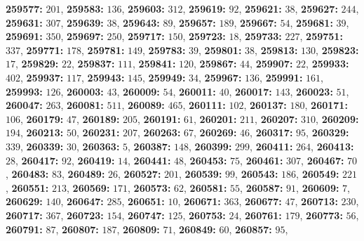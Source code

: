 \textsf{\bfseries 259577:} $201$, \textsf{\bfseries 259583:} $136$, \textsf{\bfseries 259603:} $312$, \textsf{\bfseries 259619:} $92$, \textsf{\bfseries 259621:} $38$, \textsf{\bfseries 259627:} $244$, \textsf{\bfseries 259631:} $307$, \textsf{\bfseries 259639:} $38$, \textsf{\bfseries 259643:} $89$, \textsf{\bfseries 259657:} $189$, \textsf{\bfseries 259667:} $54$, \textsf{\bfseries 259681:} $39$, \textsf{\bfseries 259691:} $350$, \textsf{\bfseries 259697:} $250$, \textsf{\bfseries 259717:} $150$, \textsf{\bfseries 259723:} $18$, \textsf{\bfseries 259733:} $227$, \textsf{\bfseries 259751:} $337$, \textsf{\bfseries 259771:} $178$, \textsf{\bfseries 259781:} $149$, \textsf{\bfseries 259783:} $39$, \textsf{\bfseries 259801:} $38$, \textsf{\bfseries 259813:} $130$, \textsf{\bfseries 259823:} $17$, \textsf{\bfseries 259829:} $22$, \textsf{\bfseries 259837:} $111$, \textsf{\bfseries 259841:} $120$, \textsf{\bfseries 259867:} $44$, \textsf{\bfseries 259907:} $22$, \textsf{\bfseries 259933:} $402$, \textsf{\bfseries 259937:} $117$, \textsf{\bfseries 259943:} $145$, \textsf{\bfseries 259949:} $34$, \textsf{\bfseries 259967:} $136$, \textsf{\bfseries 259991:} $161$, \textsf{\bfseries 259993:} $126$, \textsf{\bfseries 260003:} $43$, \textsf{\bfseries 260009:} $54$, \textsf{\bfseries 260011:} $40$, \textsf{\bfseries 260017:} $143$, \textsf{\bfseries 260023:} $51$, \textsf{\bfseries 260047:} $263$, \textsf{\bfseries 260081:} $511$, \textsf{\bfseries 260089:} $465$, \textsf{\bfseries 260111:} $102$, \textsf{\bfseries 260137:} $180$, \textsf{\bfseries 260171:} $106$, \textsf{\bfseries 260179:} $47$, \textsf{\bfseries 260189:} $205$, \textsf{\bfseries 260191:} $61$, \textsf{\bfseries 260201:} $211$, \textsf{\bfseries 260207:} $310$, \textsf{\bfseries 260209:} $194$, \textsf{\bfseries 260213:} $50$, \textsf{\bfseries 260231:} $207$, \textsf{\bfseries 260263:} $67$, \textsf{\bfseries 260269:} $46$, \textsf{\bfseries 260317:} $95$, \textsf{\bfseries 260329:} $339$, \textsf{\bfseries 260339:} $30$, \textsf{\bfseries 260363:} $5$, \textsf{\bfseries 260387:} $148$, \textsf{\bfseries 260399:} $299$, \textsf{\bfseries 260411:} $264$, \textsf{\bfseries 260413:} $28$, \textsf{\bfseries 260417:} $92$, \textsf{\bfseries 260419:} $14$, \textsf{\bfseries 260441:} $48$, \textsf{\bfseries 260453:} $75$, \textsf{\bfseries 260461:} $307$, \textsf{\bfseries 260467:} $70$, \textsf{\bfseries 260483:} $83$, \textsf{\bfseries 260489:} $26$, \textsf{\bfseries 260527:} $201$, \textsf{\bfseries 260539:} $99$, \textsf{\bfseries 260543:} $186$, \textsf{\bfseries 260549:} $221$, \textsf{\bfseries 260551:} $213$, \textsf{\bfseries 260569:} $171$, \textsf{\bfseries 260573:} $62$, \textsf{\bfseries 260581:} $55$, \textsf{\bfseries 260587:} $91$, \textsf{\bfseries 260609:} $7$, \textsf{\bfseries 260629:} $140$, \textsf{\bfseries 260647:} $285$, \textsf{\bfseries 260651:} $10$, \textsf{\bfseries 260671:} $363$, \textsf{\bfseries 260677:} $47$, \textsf{\bfseries 260713:} $230$, \textsf{\bfseries 260717:} $367$, \textsf{\bfseries 260723:} $154$, \textsf{\bfseries 260747:} $125$, \textsf{\bfseries 260753:} $24$, \textsf{\bfseries 260761:} $179$, \textsf{\bfseries 260773:} $56$, \textsf{\bfseries 260791:} $87$, \textsf{\bfseries 260807:} $187$, \textsf{\bfseries 260809:} $71$, \textsf{\bfseries 260849:} $60$, \textsf{\bfseries 260857:} $95$, 
